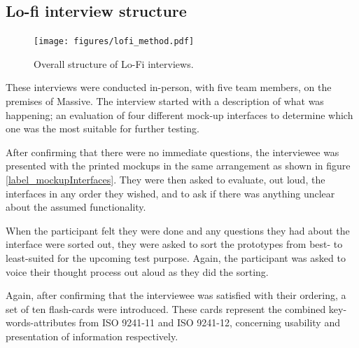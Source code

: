 \documentclass[nofilelist,dvipsnames]{cslthse-msc}
\begin{document}
      \subsection{Lo-fi interview structure}

        \begin{figure}[h!]
          \centering
          \texttt{[image: figures/lofi\_method.pdf]}
          \caption{Overall structure of Lo-Fi interviews.}
        \end{figure}

        These interviews were conducted in-person, with five team members, on
        the premises of Massive. The interview started with a description of
        what was happening; an evaluation of four different mock-up interfaces
        to determine which one was the most suitable for further testing.

        After confirming that there were no immediate questions, the
        interviewee was presented with the printed mockups in the same
        arrangement as shown in figure \ref{label_mockupInterfaces}. They were
        then asked to evaluate, out loud, the interfaces in any order they
        wished, and to ask if there was anything unclear about the assumed
        functionality.

        When the participant felt they were done and any questions they had
        about the interface were sorted out, they were asked to sort the
        prototypes from best- to least-suited for the upcoming test purpose.
        Again, the participant was asked to voice their thought process out
        aloud as they did the sorting.

        Again, after confirming that the interviewee was satisfied with their
        ordering, a set of ten flash-cards were introduced. These cards
        represent the combined key-words-attributes from ISO 9241-11 and ISO
        9241-12, concerning usability and presentation of information
        respectively.
\end{document}
